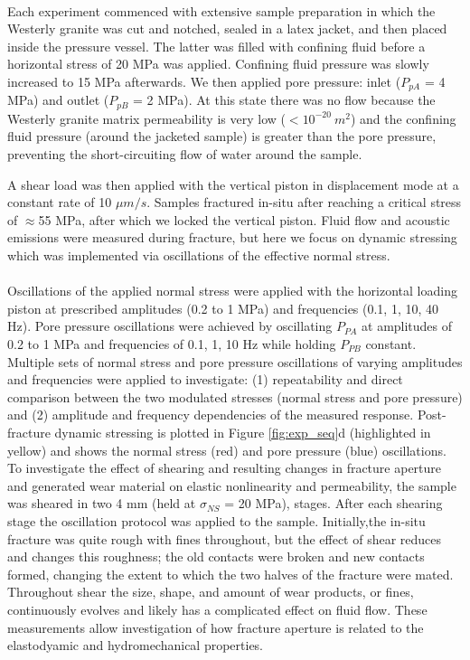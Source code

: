 \documentclass[letterpaper,10pt]{article}
\begin{document}
	\paragraph{}
	Each experiment commenced with extensive sample preparation in which the Westerly granite was cut and notched, sealed in a latex jacket, and then placed inside the pressure vessel. The latter was filled with confining fluid before a horizontal stress of 20 MPa was applied. Confining fluid pressure was slowly increased to 15 MPa afterwards. We then applied pore pressure: inlet ($P_{pA}$ = 4 MPa) and outlet ($P_{pB}$ = 2 MPa). At this state there was no flow because the Westerly granite matrix permeability is very low ($< 10^{-20}\ m^2$) and the confining fluid pressure (around the jacketed sample) is greater than the pore pressure, preventing the short-circuiting flow of water around the sample.
	
	A shear load was then applied with the vertical piston in displacement mode at a constant rate of 10 $\mu m/s$. Samples fractured in-situ after reaching a critical stress of $ \approx $55 MPa, after which we locked the vertical piston. Fluid flow and acoustic emissions were measured during fracture, but here we focus on dynamic stressing which was implemented via oscillations of the effective normal stress.
	\paragraph{}
	Oscillations of the applied normal stress were applied with the horizontal loading piston at prescribed amplitudes (0.2 to 1 MPa) and frequencies (0.1, 1, 10, 40 Hz). Pore pressure oscillations were achieved by oscillating $P_{PA}$ at amplitudes of 0.2 to 1 MPa and frequencies of 0.1, 1, 10 Hz while holding $P_{PB}$ constant. Multiple sets of normal stress and pore pressure oscillations of varying amplitudes and frequencies were applied to investigate: (1) repeatability and direct comparison between the two modulated stresses (normal stress and pore pressure) and (2) amplitude and frequency dependencies of the measured response. Post-fracture dynamic stressing is plotted in Figure \ref{fig:exp_seq}d (highlighted in yellow) and shows the normal stress (red) and pore pressure (blue) oscillations.
	To investigate the effect of shearing and resulting changes in fracture aperture and generated wear material on elastic nonlinearity and permeability, the sample was sheared in two 4 mm (held at $ \sigma_{NS} $ = 20 MPa), stages. After each shearing stage the oscillation protocol was applied to the sample. Initially,the in-situ fracture was quite rough with fines throughout, but the effect of shear reduces and changes this roughness; the old contacts were broken and new contacts formed, changing the extent to which the two halves of the fracture were mated. Throughout shear the size, shape, and amount of wear products, or fines, continuously evolves and likely has a complicated effect on fluid flow. These measurements allow investigation of how fracture aperture is related to the elastodyamic and hydromechanical properties.
	
\end{document}
